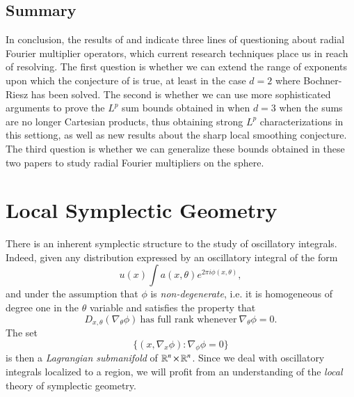 \section{Summary}

In conclusion, the results of \cite{HeoandNazarovandSeeger} and \cite{Cladek} indicate three lines of questioning about radial Fourier multiplier operators, which current research techniques place us in reach of resolving. The first question is whether we can extend the range of exponents upon which the conjecture of \cite{GarrigosandSeeger} is true, at least in the case $d = 2$ where Bochner-Riesz has been solved. The second is whether we can use more sophisticated arguments to prove the $L^p$ sum bounds obtained in \cite{Cladek} when $d = 3$ when the sums are no longer Cartesian products, thus obtaining strong $L^p$ characterizations in this settiong, as well as new results about the sharp local smoothing conjecture. The third question is whether we can generalize these bounds obtained in these two papers to study radial Fourier multipliers on the sphere. 








\chapter{Local Symplectic Geometry}

There is an inherent symplectic structure to the study of oscillatory integrals. Indeed, given any distribution expressed by an oscillatory integral of the form
%
\[ u(x) \int a(x,\theta) e^{2 \pi i \phi(x,\theta)}, \]
%
and under the assumption that $\phi$ is \emph{non-degenerate}, i.e. it is homogeneous of degree one in the $\theta$ variable and satisfies the property that
%
\[ D_{x,\theta}(\nabla_\theta \phi)\ \text{has full rank whenever}\ \nabla_\theta \phi = 0. \]%
The set
%
\[ \{ (x,\nabla_x \phi): \nabla_\phi \phi = 0 \} \]
%
is then a \emph{Lagrangian submanifold} of $\operatorname{\mathbb{R}}^n \times \operatorname{\mathbb{R}}^n$. Since we deal with oscillatory integrals localized to a region, we will profit from an understanding of the \emph{local} theory of symplectic geometry.

